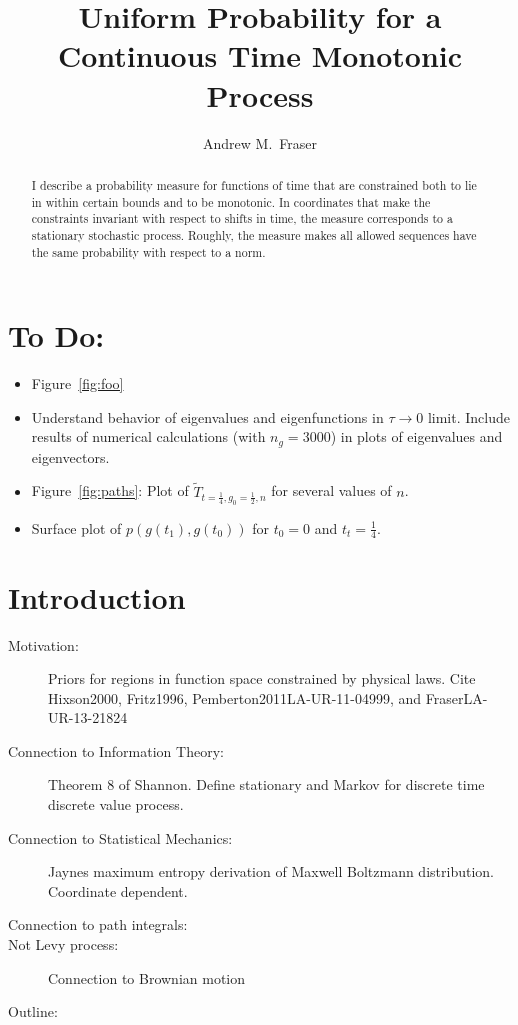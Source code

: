 \documentclass[12pt]{article} \usepackage{amsmath,amsfonts}
\title{Uniform Probability for a Continuous Time Monotonic Process }
\author{Andrew M.\ Fraser}
\begin{document}
\maketitle
\begin{abstract}
  I describe a probability measure for functions of time that are
  constrained both to lie in within certain bounds and to be
  monotonic.  In coordinates that make the constraints invariant with
  respect to shifts in time, the measure corresponds to a stationary
  stochastic process.  Roughly, the measure makes all allowed
  sequences have the same probability %
  with respect to a norm.
\end{abstract}

\section*{To Do:}
\label{sec:do}

\begin{itemize}
\item Figure~\ref{fig:foo}
\item Understand behavior of eigenvalues and eigenfunctions in
  $\tau \rightarrow 0$ limit.  Include results of numerical
  calculations (with $n_g=3000$) in plots of eigenvalues and
  eigenvectors.
\item Figure~\ref{fig:paths}: Plot of
  $\tilde T_{t=\frac{1}{4},g_0=\frac{1}{2},n}$ for several values of
  $n$.
\item Surface plot of $p(g(t_1),g(t_0))$ for $t_0=0$ and
  $t_t=\frac{1}{4}$.
\end{itemize}

\section{Introduction}
\label{sec:introduction}
\begin{description}
\item[Motivation:] Priors for regions in function space constrained by
  physical laws.  Cite Hixson2000, Fritz1996,
  Pemberton2011LA-UR-11-04999, and FraserLA-UR-13-21824
\item[Connection to Information Theory:] Theorem 8 of Shannon.  Define
  stationary and Markov for discrete time discrete value process.
\item[Connection to Statistical Mechanics:] Jaynes maximum entropy
  derivation of Maxwell Boltzmann distribution.  Coordinate dependent.
\item[Connection to path integrals:]
\item[Not Levy process:] Connection to Brownian motion
\item[Outline:]
\end{description}
\end{document}
